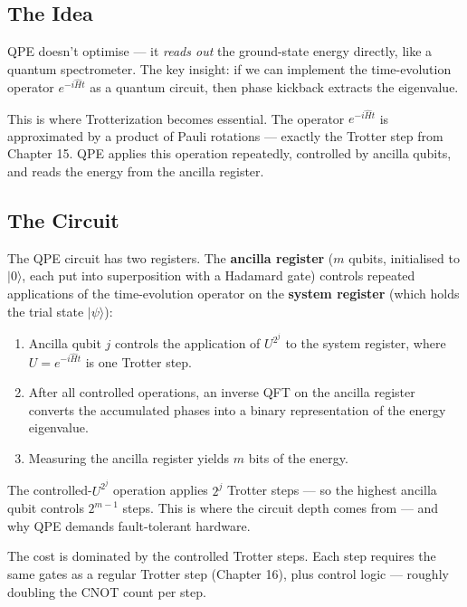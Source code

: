 \documentclass[
  11pt,
  oneside]{book}
\providecommand{\tightlist}{%
  \setlength{\itemsep}{0pt}\setlength{\parskip}{0pt}}
\begin{document}
\subsection{The Idea}\label{the-idea}

QPE doesn't optimise --- it \emph{reads out} the ground-state energy
directly, like a quantum spectrometer. The key insight: if we can
implement the time-evolution operator \(e^{-i\hat{H}t}\) as a quantum
circuit, then phase kickback extracts the eigenvalue.

This is where Trotterization becomes essential. The operator
\(e^{-i\hat{H}t}\) is approximated by a product of Pauli rotations ---
exactly the Trotter step from Chapter 15. QPE applies this operation
repeatedly, controlled by ancilla qubits, and reads the energy from the
ancilla register.

\subsection{The Circuit}\label{the-circuit}

The QPE circuit has two registers. The \textbf{ancilla register} (\(m\)
qubits, initialised to \(\lvert 0\rangle\), each put into superposition
with a Hadamard gate) controls repeated applications of the
time-evolution operator on the \textbf{system register} (which holds the
trial state \(\lvert\psi\rangle\)):

\begin{enumerate}
\def\labelenumi{\arabic{enumi}.}
\tightlist
\item
  Ancilla qubit \(j\) controls the application of \(U^{2^j}\) to the
  system register, where \(U = e^{-i\hat{H}t}\) is one Trotter step.
\item
  After all controlled operations, an inverse QFT on the ancilla
  register converts the accumulated phases into a binary representation
  of the energy eigenvalue.
\item
  Measuring the ancilla register yields \(m\) bits of the energy.
\end{enumerate}

The controlled-\(U^{2^j}\) operation applies \(2^j\) Trotter steps ---
so the highest ancilla qubit controls \(2^{m-1}\) steps. This is where
the circuit depth comes from --- and why QPE demands fault-tolerant
hardware.

The cost is dominated by the controlled Trotter steps. Each step
requires the same gates as a regular Trotter step (Chapter 16), plus
control logic --- roughly doubling the CNOT count per step.
\end{document}
